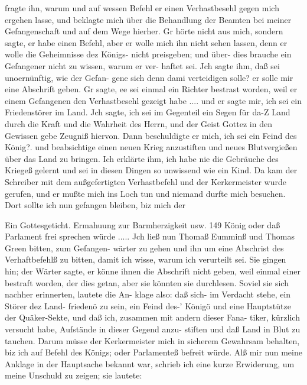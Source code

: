 fragte ihn, warum und auf wessen Befehl er einen Verhastbesehl
gegen mich ergehen lasse, und beklagte mich über die Behandlung
der Beamten bei meiner Gefangenschaft und auf dem Wege
hierher. Gr hörte nicht aus mich, sondern sagte, er habe einen
Befehl, aber er wolle mich ihn nicht sehen lassen, denn er
wolle die Geheimnisse dez Königs- nicht preisgeben; und über-
dies brauche ein Gefangener nicht zu wissen, warum er ver-
haftet sei. Jch sagte ihm, daß sei unoernünftig, wie der Gefan-
gene sich denn dami verteidigen solle? er solle mir eine Abschrift
geben. Gr sagte, ee sei einmal ein Richter bestrast worden, weil
er einem Gefangenen den Verhastbesehl gezeigt habe .... und
er sagte mir, ich sei ein Friedenstörer im Land. Jch sagte, ich
sei im Gegenteil ein Segen für da-Z Land durch die Kraft und
die Wahrheit des Herrn, und der Geist Gottez in den Gewissen
gebe Zeugniß hiervon. Dann beschuldigte er mich, ich sei ein
Feind des König?. und beabsichtige einen neuen Krieg anzustiften
und neues Blutvergießen über das Land zu bringen. Ich erklärte
ihm, ich habe nie die Gebräuche des Kriegeß gelernt und sei in
diesen Dingen so unwissend wie ein Kind. Da kam der Schreiber
mit dem außgefertigten Verhastbefehl und der Kerkermeister wurde
gerufen, und er mußte mich ins Loch tun und niemand durfte
mich besuchen. Dort sollte ich nun gefangen bleiben, biz mich der


Ein Gottesgeticht. Ermahuung zur Barmherzigkeit usw. 149
König oder daß Parlament frei sprechen würde ..... Jch ließ
nun Thomaß Eumminß und Thomas Green bitten, zum Gefangen-
wärter zu gehen und ihn um eine Abschrist des Verhaftbefehlß zu
bitten, damit ich wisse, warum ich verurteilt sei. Sie gingen hin;
der Wärter sagte, er könne ihnen die Abschrift nicht geben, weil
einmal einer bestraft worden, der dies getan, aber sie könnten sie
durchlesen. Soviel sie sich nachher erinnerten, lautete die An-
klage also: daß sich- im Verdacht stehe, ein Störer dez Land-
friedenö zu sein, ein Feind des-’ Königö und eine Hauptstütze der
Quäker-Sekte, und daß ich, zusammen mit andern dieser Fana-
tiker, kürzlich versucht habe, Aufstände in dieser Gegend anzu-
stiften und daß Land in Blut zu tauchen. Darum müsse der
Kerkermeister mich in sicherem Gewahrsam behalten, biz ich auf
Befehl des Königs; oder Parlamenteß befreit würde.
Alß mir nun meine Anklage in der Hauptsache bekannt war,
schrieb ich eine kurze Erwiderung, um meine Unschuld zu zeigen;
sie lautete:

